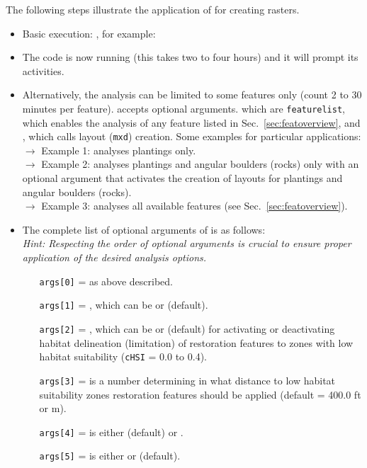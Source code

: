 The following steps illustrate the application of  for creating rasters.
\begin{itemize}
	\item Basic execution: , for example: 
	\item The code is now running (this takes two to four hours) and it will prompt its activities.
	\item Alternatively, the analysis can be limited to some features only (count 2 to 30 minutes per feature).  accepts optional arguments. which are \texttt{feature{\myUnderscore}list}, which enables the analysis of any feature listed in Sec.~\ref{sec:featoverview}, and , which calls layout (\texttt{mxd}) creation. Some examples for particular applications:\\
	$\rightarrow$ Example 1:  analyses plantings only.\\
	$\rightarrow$ Example 2:  analyses plantings and angular boulders (rocks) only with an optional argument  that activates the creation of layouts for plantings and angular boulders (rocks).\\
	$\rightarrow$ Example 3:  analyses all available features (see Sec.~\ref{sec:featoverview}).
	\item The complete list of optional arguments of  is as follows:\\
				\textit{Hint: Respecting the order of optional arguments is crucial to ensure proper application of the desired analysis options.}
				\begin{itemize}
				\item[\small{\texttt{args[0]}}] =  as above described.
				\item[\small{\texttt{args[1]}}] = , which can be  or  (default).
				\item[\small{\texttt{args[2]}}] = , which can be  or  (default) for activating or deactivating habitat delineation (limitation) of restoration features to zones with low habitat suitability (\texttt{cHSI} = 0.0 to 0.4).
				\item[\small{\texttt{args[3]}}] =  is a  number determining in what distance to low habitat suitability zones restoration features should be applied (default = 400.0 ft or m).
				\item[\small{\texttt{args[4]}}] =  is either  (default) or .
				\item[\small{\texttt{args[5]}}] =  is either  or  (default).
				\end{itemize}
\end{itemize}

